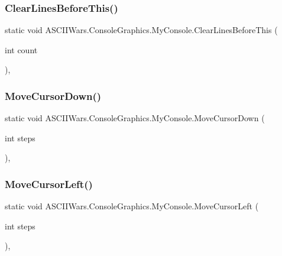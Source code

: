 \subsubsection{\texorpdfstring{Clear\+Lines\+Before\+This()}{ClearLinesBeforeThis()}}
{\footnotesize\ttfamily static void A\+S\+C\+I\+I\+Wars.\+Console\+Graphics.\+My\+Console.\+Clear\+Lines\+Before\+This (\begin{DoxyParamCaption}\item[{int}]{count }\end{DoxyParamCaption})\hspace{0.3cm}{\ttfamily [inline]}, {\ttfamily [static]}}

\hypertarget{class_a_s_c_i_i_wars_1_1_console_graphics_1_1_my_console_aa22019c9afb2464aa8a1adbfacf2e979}{}\label{class_a_s_c_i_i_wars_1_1_console_graphics_1_1_my_console_aa22019c9afb2464aa8a1adbfacf2e979} 
\subsubsection{\texorpdfstring{Move\+Cursor\+Down()}{MoveCursorDown()}}
{\footnotesize\ttfamily static void A\+S\+C\+I\+I\+Wars.\+Console\+Graphics.\+My\+Console.\+Move\+Cursor\+Down (\begin{DoxyParamCaption}\item[{int}]{steps }\end{DoxyParamCaption})\hspace{0.3cm}{\ttfamily [inline]}, {\ttfamily [static]}}

\hypertarget{class_a_s_c_i_i_wars_1_1_console_graphics_1_1_my_console_a0dab60fcee6c6b175a913e5d6d9f8c95}{}\label{class_a_s_c_i_i_wars_1_1_console_graphics_1_1_my_console_a0dab60fcee6c6b175a913e5d6d9f8c95} 
\subsubsection{\texorpdfstring{Move\+Cursor\+Left()}{MoveCursorLeft()}}
{\footnotesize\ttfamily static void A\+S\+C\+I\+I\+Wars.\+Console\+Graphics.\+My\+Console.\+Move\+Cursor\+Left (\begin{DoxyParamCaption}\item[{int}]{steps }\end{DoxyParamCaption})\hspace{0.3cm}{\ttfamily [inline]}, {\ttfamily [static]}}

